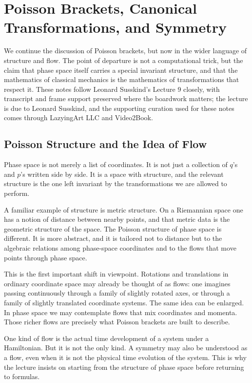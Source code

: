 \chapter{Poisson Brackets, Canonical Transformations, and Symmetry}

We continue the discussion of Poisson brackets, but now in the wider language of structure and flow. The point of departure is not a computational trick, but the claim that phase space itself carries a special invariant structure, and that the mathematics of classical mechanics is the mathematics of transformations that respect it. These notes follow Leonard Susskind's Lecture 9 closely, with transcript and frame support preserved where the boardwork matters; the lecture is due to Leonard Susskind, and the supporting curation used for these notes comes through LazyingArt LLC and Video2Book.

\section{Poisson Structure and the Idea of Flow}

Phase space is not merely a list of coordinates. It is not just a collection of \(q\)'s and \(p\)'s written side by side. It is a space with structure, and the relevant structure is the one left invariant by the transformations we are allowed to perform.

A familiar example of structure is metric structure. On a Riemannian space one has a notion of distance between nearby points, and that metric data is the geometric structure of the space. The Poisson structure of phase space is different. It is more abstract, and it is tailored not to distance but to the algebraic relations among phase-space coordinates and to the flows that move points through phase space.

This is the first important shift in viewpoint. Rotations and translations in ordinary coordinate space may already be thought of as flows: one imagines passing continuously through a family of slightly rotated axes, or through a family of slightly translated coordinate systems. The same idea can be enlarged. In phase space we may contemplate flows that mix coordinates and momenta. Those richer flows are precisely what Poisson brackets are built to describe.

One kind of flow is the actual time development of a system under a Hamiltonian. But it is not the only kind. A symmetry may also be understood as a flow, even when it is not the physical time evolution of the system. This is why the lecture insists on starting from the structure of phase space before returning to formulas.


